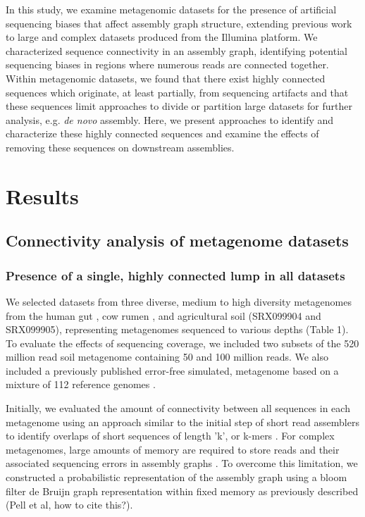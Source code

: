 \documentclass[10pt]{article}
\begin{document}
In this study, we examine metagenomic datasets for the presence of artificial sequencing biases that affect assembly graph structure, extending previous work to large and complex datasets produced from the Illumina platform. We characterized sequence connectivity in an assembly graph, identifying potential sequencing biases in regions where numerous reads are connected together.  Within metagenomic datasets, we found that there exist highly connected sequences which originate, at least partially, from sequencing artifacts and that these sequences limit approaches to divide or partition large datasets for further analysis, e.g. {\em de novo} assembly.  Here, we present approaches to identify and characterize these highly connected sequences and examine the effects of removing these sequences on downstream assemblies.

\section*{Results}

\subsection*{Connectivity analysis of metagenome datasets}

\subsubsection*{Presence of a single, highly connected lump in all datasets}
We selected datasets from three diverse, medium to high diversity metagenomes from the human gut \cite{Qin:2010p189}, cow rumen \cite{Hess:2011p686}, and agricultural soil (SRX099904 and SRX099905), representing metagenomes sequenced to various depths (Table 1).  To evaluate the effects of sequencing coverage, we included two subsets of the 520 million read soil metagenome containing 50 and 100 million reads.  We also included a previously published error-free simulated, metagenome based on a mixture of 112 reference genomes \cite{Pignatelli:2011p742}.

Initially, we evaluated the amount of connectivity between all sequences in each metagenome using an approach similar to the initial step of short read assemblers to identify overlaps of short sequences of length 'k', or k-mers \cite{Peng:2011p898,Simpson:2009p233,Zerbino:2008p665}.  For complex metagenomes, large amounts of memory are required to store reads and their associated sequencing errors in assembly graphs \cite{Hess:2011p686,Mackelprang:2011p1087,Qin:2010p189}.  To overcome this limitation, we constructed a probabilistic representation of the assembly graph using a bloom filter de Bruijn graph representation within fixed memory as previously described (Pell et al, how to cite this?).
\end{document}
